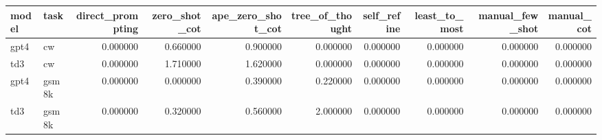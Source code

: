 \begin{tabular}{llrrrrrrrr}
\toprule
model & task & direct_prompting & zero_shot_cot & ape_zero_shot_cot & tree_of_thought & self_refine & least_to_most & manual_few_shot & manual_cot \\
\midrule
gpt4 & cw & 0.000000 & 0.660000 & 0.900000 & 0.000000 & 0.000000 & 0.000000 & 0.000000 & 0.000000 \\
td3 & cw & 0.000000 & 1.710000 & 1.620000 & 0.000000 & 0.000000 & 0.000000 & 0.000000 & 0.000000 \\
gpt4 & gsm8k & 0.000000 & 0.000000 & 0.390000 & 0.220000 & 0.000000 & 0.000000 & 0.000000 & 0.000000 \\
td3 & gsm8k & 0.000000 & 0.320000 & 0.560000 & 2.000000 & 0.000000 & 0.000000 & 0.000000 & 0.000000 \\
\bottomrule
\end{tabular}
